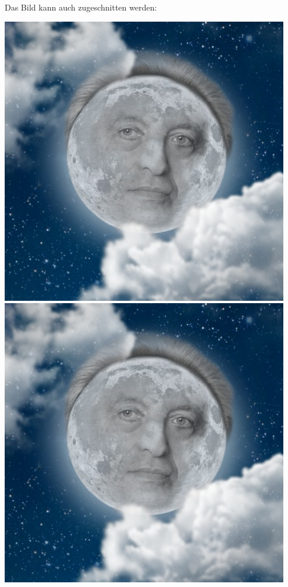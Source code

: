 \documentclass[a4paper, 10pt,onecolumn]{scrartcl}
\begin{document}
Das Bild kann auch zugeschnitten werden:

\begin{center}
	\includegraphics[clip, trim=7cm 7cm 5cm 6cm]{lotze.jpg}
	\includegraphics[clip, trim=7cm 7.5cm 6cm 7.5cm]{lotze.jpg}
\end{center}
\end{document}
